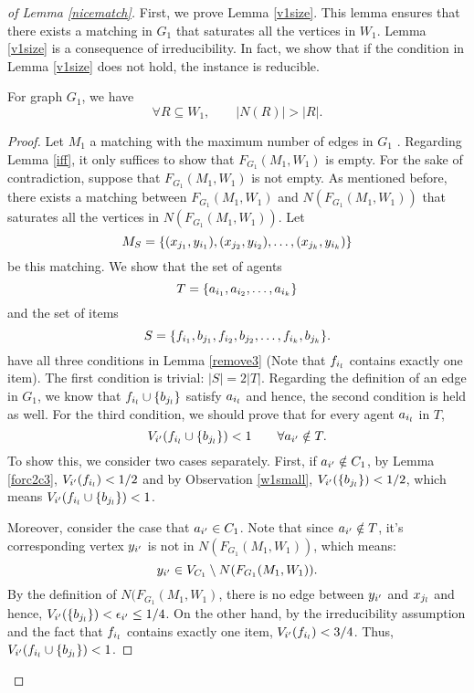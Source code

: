 \begin{proof}[of Lemma \ref{nicematch}]
First, we prove Lemma \ref{v1size}. This lemma ensures that there exists a matching in $G_1$ that saturates all the vertices in $W_1$. Lemma \ref{v1size} is a consequence of irreducibility. In fact, we show that if the condition in Lemma \ref{v1size} does not hold, the instance is reducible.
\begin{lemma}
\label{v1size}
For graph $G_1$, we have $$ \forall R \subseteq  W_1, \qquad |N(R)| > |R|.$$ 
\end{lemma}
\begin{proof}
Let $M_1$ a matching with the maximum number of edges in $G_1$ . Regarding Lemma \ref{iff}, it only suffices to show that $F_{G_1}(M_1,W_1)$ is empty. For the sake of contradiction, suppose that $F_{G_1}(M_1,W_1)$ is not empty. As mentioned before, there exists a matching between $F_{G_1}(M_1,W_1)$ and $N(F_{G_1}(M_1,W_1))$ that saturates all the vertices in $N(F_{G_1}(M_1,W_1))$. Let 
$$M_S = \{(x_{j_1},y_{i_1}),(x_{j_2},y_{i_2}),\ldots,(x_{j_k},y_{i_k})\}$$
be this matching. We show that the set of agents $$T= \{a_{i_1}, a_{i_2}, \ldots, a_{i_k}\}$$ and the set of items $$S = \{f_{i_1}, b_{j_1},f_{i_2},b_{j_2},\ldots, f_{i_k},b_{j_k} \}.$$
have all three conditions in Lemma \ref{remove3} (Note that $f_{i_l}$ contains exactly one item).  The first condition is trivial: $|S| = 2|T|$. Regarding the definition of an edge in $G_1$, we know that $f_{i_l} \cup \{b_{j_l}\}$ satisfy $a_{i_l}$ and hence, the second condition is held as well.  
For the third condition, we should prove that for every agent $a_{i_l}$ in $T$, 
$$V_{i'}(f_{i_l} \cup \{b_{j_l}\}) < 1 \qquad  \forall a_{i'} \notin T .$$
To show this, we consider two cases separately. First, if $a_{i'} \notin C_1$, by Lemma \ref{forc2c3}, $V_{i'}(f_{i_l})<1/2$ and by Observation \ref{w1small}, $V_{i'}(\{b_{j_l}\})<1/2$, which means $V_{i'}(f_{i_l} \cup \{b_{j_l}\}) < 1$.

Moreover, consider the case that $a_{i'} \in C_1$. Note that since $a_{i'} \notin T$, it's corresponding vertex $y_{i'}$ is not in $N(F_{G_1}(M_1,W_1))$, which means:
$$y_{i'} \in V_{C_1} \setminus N(F_{G_1}(M_1,W_1)).$$
By the definition of $N(F_{G_1}(M_1,W_1)$, there is no edge between $y_{i'}$ and $x_{j_l}$ and hence, $V_{i'}(\{b_{j_l}\})< \epsilon_{i'} \leq 1/4$. On the other hand, by the irreducibility assumption and the fact that $f_{i_l}$ contains exactly one item,  $V_{i'}(f_{i_l}) < 3/4$. Thus, $V_{i'}(f_{i_l} \cup \{b_{j_l}\}) < 1$. 


\end{proof}
\end{proof}
